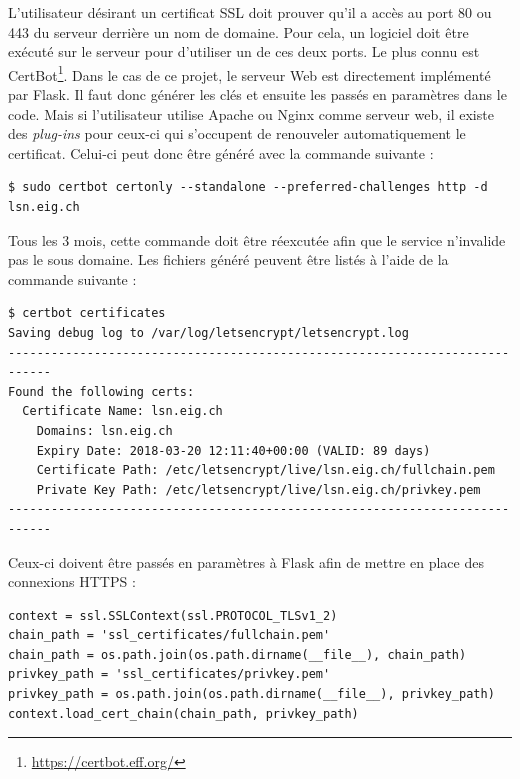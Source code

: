 L'utilisateur désirant un certificat SSL doit prouver qu'il a accès au port 80 ou 443 du serveur derrière un nom de domaine. Pour cela, un logiciel doit être exécuté sur le serveur pour d'utiliser un de ces deux ports. Le plus connu est CertBot\footnote{\url{https://certbot.eff.org/}}. Dans le cas de ce projet, le serveur Web est directement implémenté par Flask. Il faut donc générer les clés et ensuite les passés en paramètres dans le code. Mais si l'utilisateur utilise Apache ou Nginx comme serveur web, il existe des \textit{plug-ins} pour ceux-ci qui s'occupent de renouveler automatiquement le certificat. Celui-ci peut donc être généré avec la commande suivante :

\begin{tcolorbox}[top=-3mm, bottom=-3mm, left=0mm, right=0mm, enhanced, breakable, colback=LightGray, colframe=DarkGray, colbacktitle=DarkGray]
\begin{verbatim}
$ sudo certbot certonly --standalone --preferred-challenges http -d lsn.eig.ch
\end{verbatim}
\end{tcolorbox}


Tous les 3 mois, cette commande doit être réexcutée afin que le service n'invalide pas le sous domaine. Les fichiers généré peuvent être listés à l'aide de la commande suivante : 

\begin{tcolorbox}[top=-3mm, bottom=-3mm, left=0mm, right=0mm, enhanced, breakable, colback=LightGray, colframe=DarkGray, colbacktitle=DarkGray]
\begin{verbatim}
$ certbot certificates
Saving debug log to /var/log/letsencrypt/letsencrypt.log
----------------------------------------------------------------------------
Found the following certs:
  Certificate Name: lsn.eig.ch
    Domains: lsn.eig.ch
    Expiry Date: 2018-03-20 12:11:40+00:00 (VALID: 89 days)
    Certificate Path: /etc/letsencrypt/live/lsn.eig.ch/fullchain.pem
    Private Key Path: /etc/letsencrypt/live/lsn.eig.ch/privkey.pem
----------------------------------------------------------------------------
\end{verbatim}
\end{tcolorbox}

Ceux-ci doivent être passés en paramètres à Flask afin de mettre en place des connexions HTTPS : 
\begin{tcolorbox}[top=-3mm, bottom=-3mm, left=0mm, right=0mm, enhanced, breakable, colback=LightGray, colframe=DarkGray, colbacktitle=DarkGray]
\begin{verbatim}
context = ssl.SSLContext(ssl.PROTOCOL_TLSv1_2)
chain_path = 'ssl_certificates/fullchain.pem'
chain_path = os.path.join(os.path.dirname(__file__), chain_path)
privkey_path = 'ssl_certificates/privkey.pem'
privkey_path = os.path.join(os.path.dirname(__file__), privkey_path)
context.load_cert_chain(chain_path, privkey_path)
\end{verbatim}
\end{tcolorbox}

